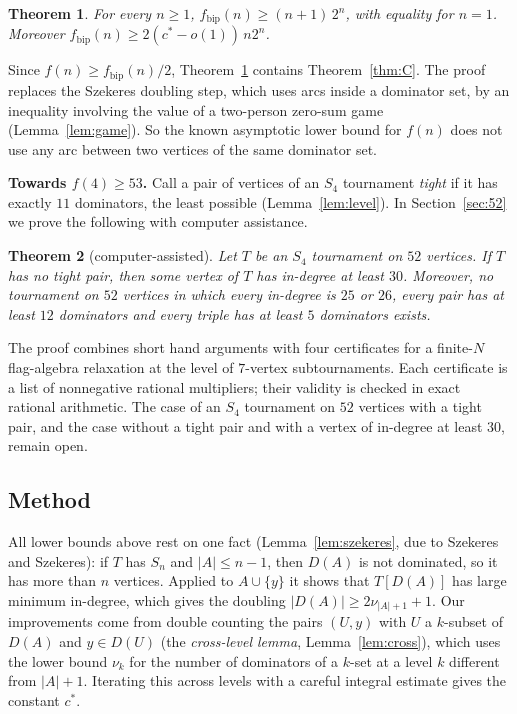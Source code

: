 \documentclass[11pt]{amsart}
\newtheorem{theorem}{Theorem}[section]
\theoremstyle{definition}
\theoremstyle{remark}
\newcommand{\D}{D}
\newcommand{\cs}{c^{*}}
\newcommand{\fb}{f_{\mathrm{bip}}}
\newcommand{\abs}[1]{\lvert #1\rvert}
\begin{document}
\begin{theorem}\label{thm:bip}
For every $n\ge 1$, $\fb(n)\ge (n+1)\,2^n$, with equality for $n=1$. Moreover $\fb(n)\ge 2(\cs-o(1))\,n2^n$.
\end{theorem}

Since $f(n)\ge\fb(n)/2$, Theorem~\ref{thm:bip} contains Theorem~\ref{thm:C}. The proof replaces the Szekeres doubling step,
which uses arcs inside a dominator set, by an inequality involving the value of a two-person zero-sum game
(Lemma~\ref{lem:game}). So the known asymptotic lower bound for $f(n)$ does not use any arc between two vertices of the same
dominator set.

\smallskip
\noindent\textbf{Towards $f(4)\ge 53$.}
Call a pair of vertices of an $S_4$ tournament \emph{tight} if it has exactly $11$ dominators, the least possible
(Lemma~\ref{lem:level}). In Section~\ref{sec:52} we prove the following with computer assistance.

\begin{theorem}[computer-assisted]\label{thm:52}
Let $T$ be an $S_4$ tournament on $52$ vertices. If $T$ has no tight pair, then some vertex of $T$ has in-degree at least $30$.
Moreover, no tournament on $52$ vertices in which every in-degree is $25$ or $26$, every pair has at least $12$ dominators and
every triple has at least $5$ dominators exists.
\end{theorem}

The proof combines short hand arguments with four certificates for a finite-$N$ flag-algebra relaxation at the level of
$7$-vertex subtournaments. Each certificate is a list of nonnegative rational multipliers; their validity is checked in exact
rational arithmetic. The case of an $S_4$ tournament on $52$ vertices with a tight pair, and the case without a tight pair
and with a vertex of in-degree at least $30$, remain open.

\subsection{Method}

All lower bounds above rest on one fact (Lemma~\ref{lem:szekeres}, due to Szekeres and Szekeres): if $T$ has $S_n$ and
$\abs{A}\le n-1$, then $\D(A)$ is not dominated, so it has more than $n$ vertices. Applied to $A\cup\{y\}$ it shows that
$T[\D(A)]$ has large minimum in-degree, which gives the doubling $\abs{\D(A)}\ge 2\nu_{\abs A+1}+1$. Our improvements come from
double counting the pairs $(U,y)$ with $U$ a $k$-subset of $\D(A)$ and $y\in\D(U)$ (the \emph{cross-level lemma},
Lemma~\ref{lem:cross}), which uses the lower bound $\nu_k$ for the number of dominators of a $k$-set at a level $k$ different
from $\abs{A}+1$. Iterating this across levels with a careful integral estimate gives the constant $\cs$.
\end{document}
